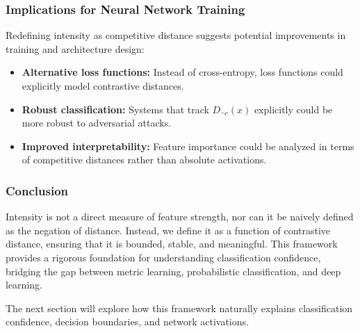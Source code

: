 \subsubsection{Implications for Neural Network Training}

Redefining intensity as competitive distance suggests potential improvements in training and architecture design:

\begin{itemize}
    \item \textbf{Alternative loss functions:} Instead of cross-entropy, loss functions could explicitly model contrastive distances.
    \item \textbf{Robust classification:} Systems that track \( D_{\neg c}(x) \) explicitly could be more robust to adversarial attacks.
    \item \textbf{Improved interpretability:} Feature importance could be analyzed in terms of competitive distances rather than absolute activations.
\end{itemize}

\subsubsection{Conclusion}

Intensity is not a direct measure of feature strength, nor can it be naively defined as the negation of distance. Instead, we define it as a function of contrastive distance, ensuring that it is bounded, stable, and meaningful. This framework provides a rigorous foundation for understanding classification confidence, bridging the gap between metric learning, probabilistic classification, and deep learning.


The next section will explore how this framework naturally explains classification confidence, decision boundaries, and network activations.
